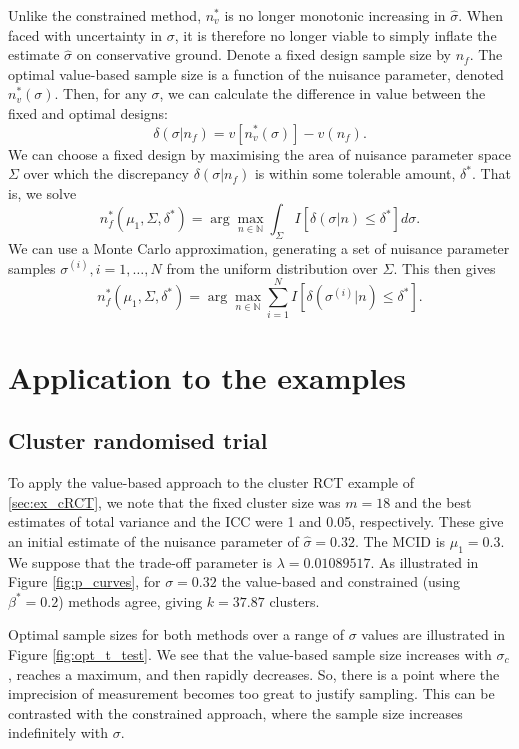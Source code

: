 \documentclass[sagev, Crown]{sagej}
\begin{document}
Unlike the constrained method, $n^*_v$ is no longer monotonic increasing in $\hat{\sigma}$. When faced with uncertainty in $\sigma$, it is therefore no longer viable to simply inflate the estimate  $\hat{\sigma}$ on conservative ground. Denote a fixed design sample size by $n_f$. The optimal value-based sample size is a function of the nuisance parameter, denoted $n^*_v(\sigma)$. Then, for any $\sigma$, we can calculate the difference in value between the fixed and optimal designs:
$$
\delta(\sigma | n_f) = v[n^*_v(\sigma)] - v(n_f).
$$
We can choose a fixed design by maximising the area of nuisance parameter space $\Sigma$ over which the discrepancy $\delta(\sigma | n_f)$ is within some tolerable amount, $\delta^*$. That is, we solve
$$
n^*_f (\mu_1, \Sigma, \delta^*) = \arg\max_{n \in \mathbb{N}} \int_{\Sigma} I[\delta(\sigma | n) \leq \delta^*] d\sigma.
$$
We can use a Monte Carlo approximation, generating a set of nuisance parameter samples $\sigma^{(i)}, i = 1, \ldots , N$ from the uniform distribution over $\Sigma$. This then gives
\begin{equation}\label{eqn:fix}
n^*_f (\mu_1, \Sigma, \delta^*) = \arg\max_{n \in \mathbb{N}} \sum_{i=1}^N I[\delta(\sigma^{(i)} | n) \leq \delta^*].
\end{equation}

\section{Application to the examples}\label{sec:illustration}

\subsection{Cluster randomised trial}

To apply the value-based approach to the cluster RCT example of \ref{sec:ex_cRCT}, we note that the fixed cluster size was $m = 18$ and the best estimates of total variance and the ICC were 1 and 0.05, respectively. These give an initial estimate of the nuisance parameter of $\hat{\sigma} = 0.32$. The MCID is $\mu_1 = 0.3$. We suppose that the trade-off parameter is $\lambda = 0.01089517$. As illustrated in Figure \ref{fig:p_curves}, for  $\sigma = 0.32$ the value-based and constrained (using $\beta^* = 0.2$) methods agree, giving $ k = 37.87$ clusters.

Optimal sample sizes for both methods over a range of $\sigma$ values are illustrated in Figure \ref{fig:opt_t_test}. We see that the value-based sample size increases with $\sigma_c$, reaches a maximum, and then rapidly decreases. So, there is a point where the imprecision of measurement becomes too great to justify sampling. This can be contrasted with the constrained approach, where the sample size increases indefinitely with $\sigma$.
\end{document}
